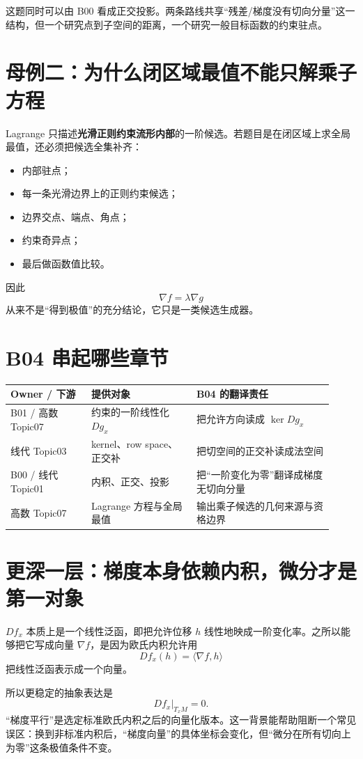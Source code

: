 \documentclass[profile=standard]{ipara-handbook}
\begin{document}
这题同时可以由 B00 看成正交投影。两条路线共享“残差/梯度没有切向分量”这一结构，但一个研究点到子空间的距离，一个研究一般目标函数的约束驻点。

\section{母例二：为什么闭区域最值不能只解乘子方程}
Lagrange 只描述\textbf{光滑正则约束流形内部}的一阶候选。若题目是在闭区域上求全局最值，还必须把候选全集补齐：
\begin{itemize}
\item 内部驻点；
\item 每一条光滑边界上的正则约束候选；
\item 边界交点、端点、角点；
\item 约束奇异点；
\item 最后做函数值比较。
\end{itemize}

因此
\[
\boxed{\nabla f=\lambda\nabla g}
\]
从来不是“得到极值”的充分结论，它只是一类候选生成器。

\section{B04 串起哪些章节}
\begin{tabular}{p{0.23\linewidth}p{0.30\linewidth}p{0.39\linewidth}}
\hline
Owner / 下游 & 提供对象 & B04 的翻译责任\\
\hline
B01 / 高数 Topic07 & 约束的一阶线性化 $Dg_x$ & 把允许方向读成 $\ker Dg_x$\\
线代 Topic03 & kernel、row space、正交补 & 把切空间的正交补读成法空间\\
B00 / 线代 Topic01 & 内积、正交、投影 & 把“一阶变化为零”翻译成梯度无切向分量\\
高数 Topic07 & Lagrange 方程与全局最值 & 输出乘子候选的几何来源与资格边界\\
\hline
\end{tabular}

\section{更深一层：梯度本身依赖内积，微分才是第一对象}
$Df_x$ 本质上是一个线性泛函，即把允许位移 $h$ 线性地映成一阶变化率。之所以能够把它写成向量 $\nabla f$，是因为欧氏内积允许用
\[
Df_x(h)=\langle\nabla f,h\rangle
\]
把线性泛函表示成一个向量。

所以更稳定的抽象表达是
\[
Df_x|_{T_xM}=0.
\]
“梯度平行”是选定标准欧氏内积之后的向量化版本。这一背景能帮助阻断一个常见误区：换到非标准内积后，“梯度向量”的具体坐标会变化，但“微分在所有切向上为零”这条极值条件不变。
\end{document}
